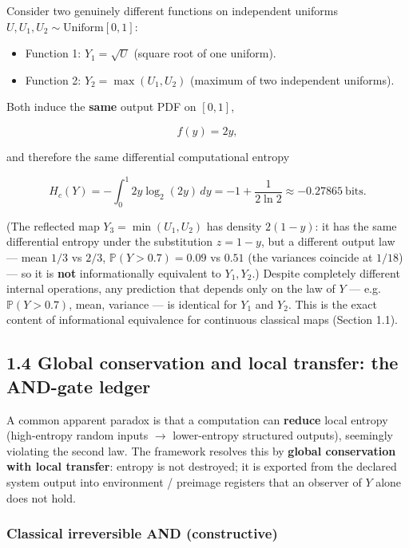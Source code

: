 \documentclass[
  11pt,
]{article}
\providecommand{\tightlist}{%
  \setlength{\itemsep}{0pt}\setlength{\parskip}{0pt}}
\begin{document}
Consider two genuinely different functions on independent uniforms \(U,U_1,U_2\sim\mathrm{Uniform}[0,1]\):

\begin{itemize}
\tightlist
\item
  Function 1: \(Y_1=\sqrt{U}\) (square root of one uniform).\\
\item
  Function 2: \(Y_2=\max(U_1,U_2)\) (maximum of two independent uniforms).
\end{itemize}

Both induce the \textbf{same} output PDF on \([0,1]\),

\[
f(y)=2y,
\]

and therefore the same differential computational entropy

\[
H_c(Y)=-\int_0^1 2y\log_2(2y)\,dy = -1+\frac{1}{2\ln 2}\approx -0.27865\ \mathrm{bits}.
\]

(The reflected map \(Y_3=\min(U_1,U_2)\) has density \(2(1-y)\): it has the same differential entropy under the substitution \(z=1-y\), but a different output law --- mean \(1/3\) vs \(2/3\), \(\mathbb{P}(Y>0.7)=0.09\) vs \(0.51\) (the variances coincide at \(1/18\)) --- so it is \textbf{not} informationally equivalent to \(Y_1,Y_2\).) Despite completely different internal operations, any prediction that depends only on the law of \(Y\) --- e.g.~\(\mathbb{P}(Y>0.7)\), mean, variance --- is identical for \(Y_1\) and \(Y_2\). This is the exact content of informational equivalence for continuous classical maps (Section 1.1).

\subsection{1.4 Global conservation and local transfer: the AND-gate ledger}\label{global-conservation-and-local-transfer-the-and-gate-ledger}

A common apparent paradox is that a computation can \textbf{reduce} local entropy (high-entropy random inputs $\rightarrow$ lower-entropy structured outputs), seemingly violating the second law. The framework resolves this by \textbf{global conservation with local transfer}: entropy is not destroyed; it is exported from the declared system output into environment / preimage registers that an observer of \(Y\) alone does not hold.

\subsubsection{Classical irreversible AND (constructive)}\label{classical-irreversible-and-constructive}
\end{document}
